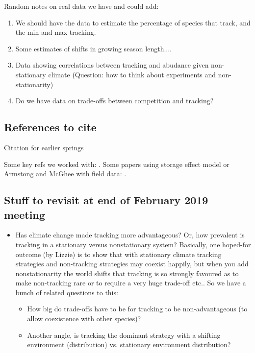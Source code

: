 \documentclass[11pt,letterpaper]{article}
\begin{document}
Random notes on real data we have and could add:
\begin{enumerate}
\item We should have the data to estimate the
percentage of species that track, and the min and max tracking.
\item Some estimates of shifts in growing season length....
\item Data showing correlations between tracking and abudance given non-stationary climate (Question: how to think about experiments and non-stationarity)
\item Do we have data on trade-offs between competition and tracking? 
\end{enumerate}

\subsection{References to cite}
\noindent Citation for earlier springs %

\noindent Some key refs we worked with:
\citep{Chesson:1993gi,Chesson:2000ak,Chesson:2000vd,Chesson:2004eo}. Some
papers using storage effect model or Armstong and McGhee with field
data: \citep{Angert:2009,Kuang:2008ri,Kuang:2009rj,Levine:2009ym}.



\subsection{Stuff to revisit at end of February 2019 meeting}
\begin{itemize}
\item Has climate change made tracking more advantageous? Or, how prevalent is tracking in a stationary versus nonstationary system? Basically, one hoped-for outcome (by Lizzie) is to show that with stationary climate tracking strategies and non-tracking strategies may coexist happily, but when you add nonstationarity the world shifts that tracking is so strongly favoured as to make non-tracking rare or to require a very huge trade-off etc.. So we have a bunch of related questions to this:
\begin{itemize}
\item How big do trade-offs have to be for tracking to be non-advantageous (to allow coexistence with other species)?
\item Another angle, is tracking the dominant strategy with a shifting environment (distribution) vs. stationary environment distribution?
\end{itemize}
\end{itemize}
\end{document}
